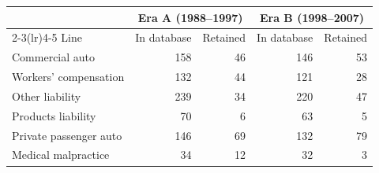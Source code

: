 \begin{tabular}{lrrrr}
\toprule
& \multicolumn{2}{c}{Era A (1988--1997)} & \multicolumn{2}{c}{Era B (1998--2007)} \\
\cmidrule(lr){2-3}\cmidrule(lr){4-5}
Line & In database & Retained & In database & Retained \\
\midrule
Commercial auto & 158 & 46 & 146 & 53 \\
Workers' compensation & 132 & 44 & 121 & 28 \\
Other liability & 239 & 34 & 220 & 47 \\
Products liability & 70 & 6 & 63 & 5 \\
Private passenger auto & 146 & 69 & 132 & 79 \\
Medical malpractice & 34 & 12 & 32 & 3 \\
\bottomrule
\end{tabular}
